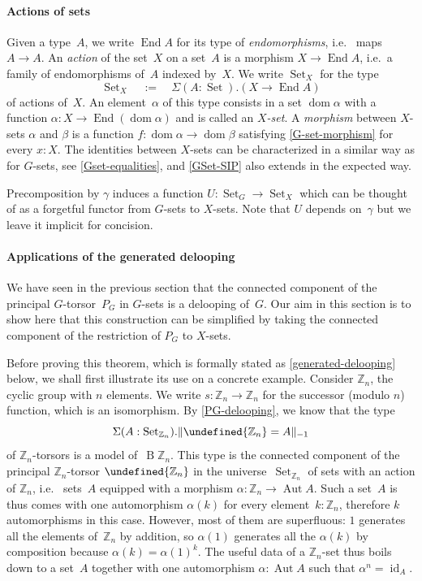 \documentclass[10pt,a4paper]{amsart}
\theoremstyle{definition}
\newcommand{\Z}{\mathbb{Z}} %
\newcommand{\id}{\operatorname{id}} %
\newcommand{\dom}{\operatorname{dom}} %
\newcommand{\B}{\operatorname{B}} %
\newcommand{\trunc}[2]{\|#2\|_{#1}} %
\newcommand{\ptrunc}[1]{\trunc{-1}{#1}} %
\newcommand{\defd}{:=} %
\newcommand{\qdefd}{\quad\defd\quad}
\newcommand{\End}{\operatorname{End}} %
\newcommand{\Aut}{\operatorname{Aut}} %
\let\P\undefined
\newcommand{\P}[1]{\operatorname{P}_{#1}} %
\newcommand{\Set}{\operatorname{Set}} %
\newcommand{\GSet}[1][G]{\Set_{#1}} %
\newcommand{\XSet}[1][X]{\Set_{#1}} %
\newcommand{\ie}{i.e.~}
\begin{document}
\paragraph{Actions of sets} 
Given a type~$A$, we write $\End A$ for its type of \emph{endomorphisms}, \ie
maps $A\to A$. An \emph{action} of the set~$X$ on a set~$A$ is a morphism
$X\to\End A$, \ie a family of endomorphisms of~$A$ indexed by~$X$.
%
We write $\XSet$ for the type
\[
  \XSet
  \qdefd
  \Sigma(A:\Set).(X\to\End A)
  \]
of actions of~$X$. An element~$\alpha$ of this type consists in a set $\dom\alpha$ with a function
$\alpha:X\to\End(\dom\alpha)$ and is called an \emph{$X$-set}. A
\emph{morphism} between $X$-sets $\alpha$ and $\beta$ is a function
$f:\dom\alpha\to\dom\beta$ satisfying \cref{G-set-morphism} for every $x:X$.
%
The identities between $X$-sets can be characterized in a similar way as for
$G$-sets, see \cref{Gset-equalities}, and \cref{GSet-SIP} also extends in the
expected way.

Precomposition by $\gamma$ induces a function $U:\GSet\to\XSet$ which can be
thought of as a forgetful functor from $G$-sets to $X$-sets. Note that $U$
depends on~$\gamma$ but we leave it implicit for concision.

\paragraph{Applications of the generated delooping}
We have seen in the previous section that the connected
component of the principal $G$-torsor~$P_G$ in $G$-sets is a delooping
of~$G$. Our aim in this section is to show here that this construction can be
simplified by taking the connected component of the restriction of $P_G$ to $X$-sets.

Before proving this theorem, which is formally stated as
\cref{generated-delooping} below, we shall first illustrate its use on a
concrete example. Consider $\Z_n$, the cyclic group with $n$ elements. We write
$s:\Z_n\to\Z_n$ for the successor (modulo $n$) function, which is an
isomorphism. By \cref{PG-delooping}, we know that the type
\[
  \Sigma(A:\GSet[\Z_n]).\ptrunc{\P{\Z_n}=A}
\]
of $\Z_n$-torsors is a model of~$\B\Z_n$.
%
This type is the connected component of the principal $\Z_n$-torsor $\P{\Z_n }$
in the universe~$\GSet[\Z_n]$ of sets with an action of $\Z_n$, \ie
sets~$A$ equipped with a morphism $ \alpha:\Z_n\to\Aut A $. Such a set~$A$ is
thus comes with one automorphism $\alpha(k)$ for every element~$k:\Z_n$,
therefore $k$ automorphisms in this case. However, most of them are superfluous:
$1$ generates all the elements of~$\Z_n$ by addition, so $\alpha(1)$
generates all the $\alpha(k)$ by composition because $\alpha(k)=\alpha(1)^k$.
%
The useful data of a $\Z_n$-set thus boils down to a set~$A$ together with one
automorphism $\alpha:\Aut A$ such that $\alpha^n=\id_A$.
\end{document}
